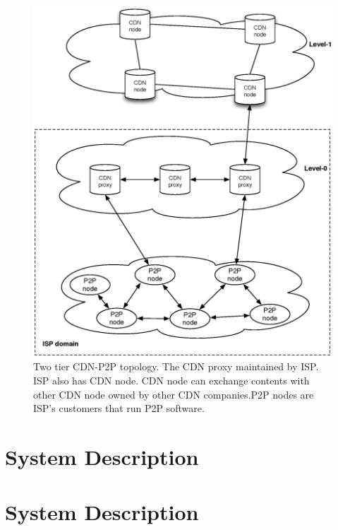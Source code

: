 \documentclass[paper]{ieice}
\begin{document}
\begin{figure}[hb]
\begin{center}
\includegraphics[scale=0.4]{graphs/two-tier-cdn-topology.eps}
\end{center}
\caption{Two tier CDN-P2P topology.
The CDN proxy maintained by ISP. ISP also has CDN node. CDN node can exchange contents with other CDN node owned by other CDN companies.P2P nodes are ISP's customers that run P2P software.}
\label{fig:twotier}
\vspace{-2mm}
\end{figure} 


 
\section{System Description}\label{description}

\section{System Description}\label{description}
\end{document}
